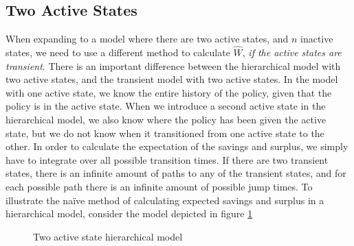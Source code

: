 \documentclass[12pt]{article}
\theoremstyle{my_thm}
\begin{document}
\subsection{Two Active States}
When expanding to a model where there are two active states, and $n$ inactive states, we need to use a different method to calculate $\hat{W}$, \textit{if the active states are transient}. There is an important difference between the hierarchical model with two active states, and the transient model with two active states. In the model with one active state, we know the entire history of the policy, given that the policy is in the active state. When we introduce a second active state in the hierarchical model, we also know where the policy has been given the active state, but we do not know when it transitioned from one active state to the other. In order to calculate the expectation of the savings and surplus, we simply have to integrate over all possible transition times. If there are two transient states, there is an infinite amount of paths to any of the transient states, and for each possible path there is an infinite amount of possible jump times.
To illustrate the naïve method of calculating expected savings and surplus in a hierarchical model, consider the model depicted in figure \ref{fig:2}
 \def\PlA{(0,0)}
\begin{figure}[H]
\begin{center}
\caption{Two active state hierarchical model}
\label{fig:2}
\end{center}
\end{figure}
\end{document}
